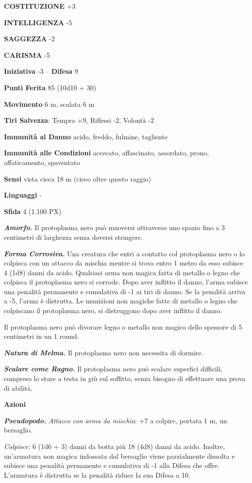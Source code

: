 \begin{multicols}{2}
	\textbf{COSTITUZIONE} +3

	\textbf{INTELLIGENZA} -5

	\textbf{SAGGEZZA} -2

	\textbf{CARISMA} -5

	\textbf{Iniziativa} -3 -- \textbf{Difesa} 9

	\textbf{Punti Ferita} 85 (10d10 + 30)

	\textbf{Movimento} 6 m, scalata 6 m

	\textbf{Tiri Salvezza}: Tempra +9, Riflessi -2, Volontà -2

	\textbf{Immunità al Danno} acido, freddo, fulmine, tagliente

	\textbf{Immunità alle Condizioni} accecato, affascinato, assordato, prono, affaticamento, spaventato

	\textbf{Sensi} vista cieca 18 m (cieco oltre questo raggio)

	\textbf{Linguaggi} -

	\textbf{Sfida} 4 (1.100 PX)

	\textit{\textbf{Amorfo.}} Il protoplasma nero può muoversi attraverso uno spazio fino a 3 centimetri di larghezza senza doversi stringere.

	\textit{\textbf{Forma Corrosiva.}} Una creatura che entri a contatto col protoplasma nero o lo colpisca con un attacco da mischia mentre si trova entro 1 metro da esso subisce 4 (1d8) danni da acido. Qualsiasi arma non magica fatta di metallo o legno che colpisca il protoplasma nero si corrode. Dopo aver inflitto il danno, l'arma subisce una penalità permanente e cumulativa di -1 ai tiri di danno. Se la penalità arriva a -5, l'arma è distrutta. Le munizioni non magiche fatte di metallo o legno che colpiscano il protoplasma nero, si distruggono dopo aver inflitto il danno.

	Il protoplasma nero può divorare legno o metallo non magico dello spessore di 5 centimetri in un 1 round.

	\textit{\textbf{Natura di Melma.}} Il protoplasma nero non necessita di dormire.

	\textit{\textbf{Scalare come Ragno.}} Il protoplasma nero può scalare superfici difficili, compreso lo stare a testa in giù sul soffitto, senza bisogno di effettuare una prova di abilità.

	\textbf{Azioni}

	\textit{\textbf{Pseudopodo.} Attacco con arma da mischia}: +7 a colpire, portata 1 m, un bersaglio.

	\textit{Colpisce:} 6 (1d6 + 3) danni da botta più 18 (4d8) danni da acido. Inoltre, un'armatura non magica indossata dal bersaglio viene parzialmente dissolta e subisce una penalità permanente e cumulativa di -1 alla Difesa che offre. L'armatura è distrutta se la penalità riduce la sua Difesa a 10.


\end{multicols}
